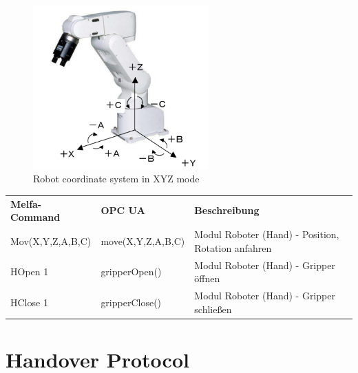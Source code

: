 \documentclass{article}
\begin{document}
\begin{figure}[htp]
	\centering
	\includegraphics[width=0.6\textwidth]{images/robot_axis.png}
	\caption{Robot coordinate system in XYZ mode}
	\label{fig:robot_axis}
\end{figure}

\begin{center}
	\setlength\extrarowheight{4pt}
	\small
	
	\begin{tabularx}{\textwidth}{|p{3cm}|p{4cm}|X|}
		\hline
		\rowcolor{tublau}
		\multicolumn{3}{|c|}{\bf \color{white} \large Gripper}\\
		\hline\hline
		\rowcolor{gray!80}
		\bf Melfa-Command & \bf OPC UA & \bf Beschreibung\\
		\hline\hline
		Mov(X,Y,Z,A,B,C) & move(X,Y,Z,A,B,C) & Modul Roboter (Hand) - Position, Rotation anfahren\\
		HOpen 1 & gripperOpen() & Modul Roboter (Hand) - Gripper öffnen\\
		HClose 1 & gripperClose() & Modul Roboter (Hand) - Gripper schließen\\
		\hline
	\end{tabularx}
\end{center}



\section{Handover Protocol}
\end{document}

